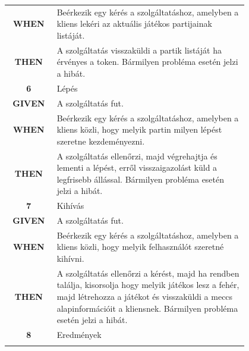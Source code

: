 \documentclass[twoside, a4paper, 12pt]{book}
\begin{document}
\begin{longtable}[c]{|c|p{0.8\linewidth}|}
	\textbf{WHEN} &
	Beérkezik egy kérés a szolgáltatáshoz, amelyben a kliens lekéri az aktuális játékos partijainak listáját.
	\\
	\nobreakhline
	
	\textbf{THEN} &
	A szolgáltatás visszaküldi a partik listáját ha érvényes a token.
	Bármilyen probléma esetén jelzi a hibát.
	\\
	\hline
	
	
	\rowcolor[HTML]{CBCEFB} 
	\textbf{6}
	&	Lépés
	\\ \nobreakhline
	
	\textbf{GIVEN} &
	A szolgáltatás fut.
	\\ \nobreakhline
	
	\textbf{WHEN} &
	Beérkezik egy kérés a szolgáltatáshoz, amelyben a kliens közli, hogy melyik partin milyen lépést szeretne kezdeményezni.
	\\
	\nobreakhline
	
	\textbf{THEN} &
	A szolgáltatás ellenőrzi, majd végrehajtja és lementi a lépést, erről visszaigazolást küld a legfrisebb állással.
	Bármilyen probléma esetén jelzi a hibát.
	\\
	\hline
	
	
	\rowcolor[HTML]{CBCEFB} 
	\textbf{7}
	&	Kihívás
	\\ \nobreakhline
	
	\textbf{GIVEN} &
	A szolgáltatás fut.
	\\ \nobreakhline
	
	\textbf{WHEN} &
	Beérkezik egy kérés a szolgáltatáshoz, amelyben a kliens közli, hogy melyik felhasználót szeretné kihívni.
	\\
	\nobreakhline
	
	\textbf{THEN} &
	A szolgáltatás ellenőrzi a kérést, majd ha rendben találja, kisorsolja hogy melyik játékos lesz a fehér, majd létrehozza a játékot és visszaküldi a meccs alapinformációit a kliensnek.
	Bármilyen probléma esetén jelzi a hibát.
	\\
	\hline
	
	
	\rowcolor[HTML]{CBCEFB} 
	\textbf{8}
	&	Eredmények
	\\ \nobreakhline
	

\end{longtable}
\end{document}
